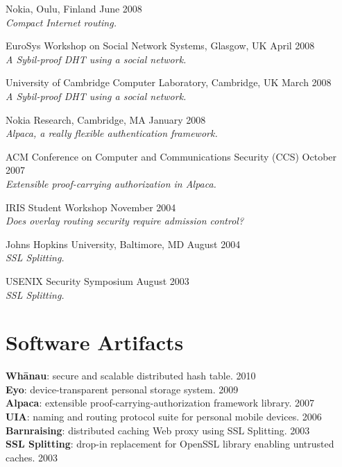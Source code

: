 \documentclass[margin,line,11pt]{resume}
\let\oldsection=\section
\renewcommand{\section}[1]{\oldsection{\small\sc #1}}
\def\Whanau{Wh\=a\-nau\xspace}
\begin{document}
\begin{resume}
Nokia, Oulu, Finland \hfill June 2008\\
\textsl{Compact Internet routing.}

EuroSys Workshop on Social Network Systems, Glasgow, UK \hfill April 2008\\
\textsl{A Sybil-proof DHT using a social network.}

University of Cambridge Computer Laboratory, Cambridge, UK \hfill March 2008\\
\textsl{A Sybil-proof DHT using a social network.}

Nokia Research, Cambridge, MA \hfill January 2008\\
\textsl{Alpaca, a really flexible authentication framework.}

ACM Conference on Computer and Communications Security (CCS) \hfill October 2007\\
\textsl{Extensible proof-carrying authorization in Alpaca.}

IRIS Student Workshop \hfill November 2004\\
\textsl{Does overlay routing security require admission control?}

Johns Hopkins University, Baltimore, MD \hfill August 2004\\
\textsl{SSL Splitting.}

USENIX Security Symposium \hfill August 2003\\
\textsl{SSL Splitting.}




\section{Software Artifacts}

\textbf{\Whanau}:
secure and scalable distributed hash table.
\hfill 2010 \\
\textbf{Eyo}:
device-transparent personal storage system.
\hfill 2009 \\
\textbf{Alpaca}:
extensible proof-carrying-authorization framework library.
\hfill 2007 \\
\textbf{UIA}:
naming and routing protocol suite for personal mobile devices.
\hfill 2006 \\
\textbf{Barnraising}:
distributed caching Web proxy using SSL Splitting.
\hfill 2003 \\
\textbf{SSL Splitting}:
drop-in replacement for OpenSSL library enabling untrusted caches.
\hfill 2003 \\


\end{resume}
\end{document}
